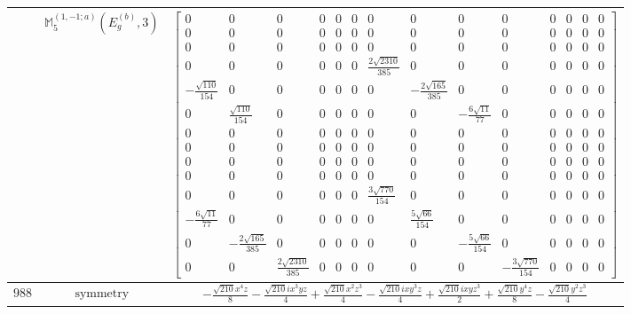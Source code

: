 \documentclass[fleqn,8pt,landscape]{jsarticle}
\begin{document}
\begin{longtable}{ccc}
$  $ & $ \mathbb{M}_{5}^{(1,-1;a)}(E_{g}^{(b)},3) $ & $ \begin{bmatrix} 0 & 0 & 0 & 0 & 0 & 0 & 0 & 0 & 0 & 0 & 0 & 0 & 0 & 0 \\ 0 & 0 & 0 & 0 & 0 & 0 & 0 & 0 & 0 & 0 & 0 & 0 & 0 & 0 \\ 0 & 0 & 0 & 0 & 0 & 0 & 0 & 0 & 0 & 0 & 0 & 0 & 0 & 0 \\ 0 & 0 & 0 & 0 & 0 & 0 & \frac{2 \sqrt{2310}}{385} & 0 & 0 & 0 & 0 & 0 & 0 & 0 \\ - \frac{\sqrt{110}}{154} & 0 & 0 & 0 & 0 & 0 & 0 & - \frac{2 \sqrt{165}}{385} & 0 & 0 & 0 & 0 & 0 & 0 \\ 0 & \frac{\sqrt{110}}{154} & 0 & 0 & 0 & 0 & 0 & 0 & - \frac{6 \sqrt{11}}{77} & 0 & 0 & 0 & 0 & 0 \\ 0 & 0 & 0 & 0 & 0 & 0 & 0 & 0 & 0 & 0 & 0 & 0 & 0 & 0 \\ 0 & 0 & 0 & 0 & 0 & 0 & 0 & 0 & 0 & 0 & 0 & 0 & 0 & 0 \\ 0 & 0 & 0 & 0 & 0 & 0 & 0 & 0 & 0 & 0 & 0 & 0 & 0 & 0 \\ 0 & 0 & 0 & 0 & 0 & 0 & 0 & 0 & 0 & 0 & 0 & 0 & 0 & 0 \\ 0 & 0 & 0 & 0 & 0 & 0 & \frac{3 \sqrt{770}}{154} & 0 & 0 & 0 & 0 & 0 & 0 & 0 \\ - \frac{6 \sqrt{11}}{77} & 0 & 0 & 0 & 0 & 0 & 0 & \frac{5 \sqrt{66}}{154} & 0 & 0 & 0 & 0 & 0 & 0 \\ 0 & - \frac{2 \sqrt{165}}{385} & 0 & 0 & 0 & 0 & 0 & 0 & - \frac{5 \sqrt{66}}{154} & 0 & 0 & 0 & 0 & 0 \\ 0 & 0 & \frac{2 \sqrt{2310}}{385} & 0 & 0 & 0 & 0 & 0 & 0 & - \frac{3 \sqrt{770}}{154} & 0 & 0 & 0 & 0 \end{bmatrix} $ \\ \hline
$ 988 $ & $ \text{symmetry} $ & $ - \frac{\sqrt{210} x^{4} z}{8} - \frac{\sqrt{210} i x^{3} y z}{4} + \frac{\sqrt{210} x^{2} z^{3}}{4} - \frac{\sqrt{210} i x y^{3} z}{4} + \frac{\sqrt{210} i x y z^{3}}{2} + \frac{\sqrt{210} y^{4} z}{8} - \frac{\sqrt{210} y^{2} z^{3}}{4} $ \\

\end{longtable}
\end{document}
